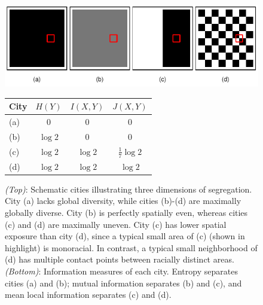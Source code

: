 \documentclass[9pt,twocolumn,twoside]{pnas-new}
\begin{document}
\begin{figure}%
		\centering %
		\includegraphics[width=\linewidth]{figs/checkerboard.pdf}
		\begin{tabular}{l | c c c} 
		\textbf{City} & $H(Y)$ & $I(X,Y)$ & $J(X,Y)$ \\
		\hline
		(a) & $0$        & $0$        & $0$\\
		(b) & $\log 2$ & $0$        & $0$\\
		(c) & $\log 2$ & $\log 2$ & $\frac{1}{7} \log 2$\\
		(d) & $\log 2$ & $\log 2$ & $\log 2$
		\end{tabular}
		\caption{
			\emph{(Top)}: Schematic cities illustrating three dimensions of segregation. 
			City (a) lacks global diversity, while cities (b)-(d) are maximally globally diverse. 
			City (b) is perfectly spatially even, whereas cities (c) and (d) are maximally uneven. 
			City (c) has lower spatial exposure than city (d), since a typical small area of (c) (shown in highlight) is monoracial.
			In contrast, a typical small neighborhood of (d) has multiple contact points between racially distinct areas. 
			\emph{(Bottom)}: Information measures of each city. Entropy separates cities (a) and (b); mutual information separates (b) and (c), and mean local information separates (c) and (d). 
		} \label{fig:checkerboard}
	\end{figure}
\end{document}
